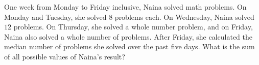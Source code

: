 One week from Monday to Friday inclusive, Naina solved math problems. On Monday and Tuesday, she solved $8$ problems each. On Wednesday, Naina solved $12$ problems. On Thursday, she solved a whole number problem, and on Friday, Naina also solved a whole number of problems. After Friday, she calculated the median number of problems she solved over the past five days. What is the sum of all possible values of Naina's result? 